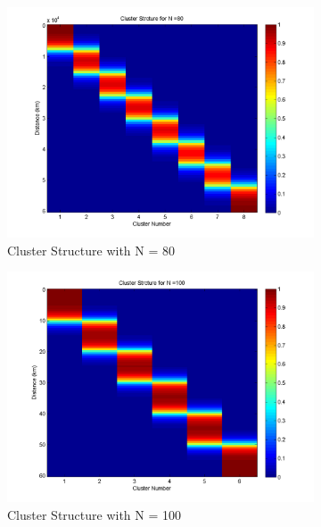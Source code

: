 \begin{figure}[H]
\centering
\begin{subfigure}[b]{0.4\textwidth}
\centering
\includegraphics[width=\textwidth]{figures_2/fig_cluster_162_60_300}
\caption{Cluster Structure with N = 80}
\label{clust_N_80}
\end{subfigure}
\begin{subfigure}[b]{0.4\textwidth}
\centering
\includegraphics[width=\textwidth]{figures_2/fig_cluster_202_60_300}
\caption{Cluster Structure with N = 100}
\label{clust_N_100}
\end{subfigure}  \\
\begin{subfigure}[b]{0.4\textwidth}
\centering

\end{subfigure}
\end{figure}
